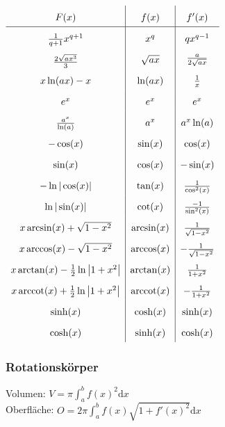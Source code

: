 \documentclass[6pt,a4paper]{scrartcl}
\DeclareMathOperator{\arccot}{arccot}
\begin{document}
\begin{multicols*}{4}
\everymath{\displaystyle}	%
\begin{math}\renewcommand{\arraystretch}{1.8}
\begin{array}{c|c|c}
F(x) & f(x) & f'(x) \\ \hline
\frac{1}{q+1}x^{q+1} & x^q & qx^{q-1} \\
\raisebox{-0.2em}{$\frac{2\sqrt{ax^3}}{3}$} & \sqrt{ax} & \raisebox{0.2em}{$\frac{a}{2\sqrt{ax}}$}\\
x\ln(ax) -x & \ln(ax) & \textstyle \frac{1}{x}\\
e^x & e^x & e^x \\
\frac{a^x}{\ln(a)} & a^x & a^x \ln(a) \\
-\cos(x) & \sin(x) & \cos(x)\\
\sin(x) & \cos(x) & -\sin(x)\\
-\ln |\cos(x)| & \tan(x) & \frac{1}{\cos^2(x)} \\
\ln |\sin(x)| & \cot(x) & \frac{-1}{\sin^2(x)} \\
x\arcsin (x)+\sqrt{1-x^2} & \arcsin(x) & \frac{1}{\sqrt{1-x^2}}\\
x\arccos (x)-\sqrt{1-x^2} & \arccos(x) & -\frac{1}{\sqrt{1-x^2}}\\
x\arctan (x)-\frac{1}{2} \ln \left| 1+ x^2 \right| & \arctan (x) & \frac{1}{1+x^2} \\
x\arccot (x)+\frac{1}{2} \ln \left| 1+ x^2 \right| & \arccot (x) & -\frac{1}{1+x^2} \\
\sinh(x) & \cosh(x) & \sinh (x) \\
\cosh(x) & \sinh(x) & \cosh (x)\\
\end{array}
\end{math}
\everymath{\textstyle}


\subsubsection{Rotationskörper}
Volumen: $V = \pi \int_a^b f(x)^2 \mathrm dx$\\
Oberfläche: $O = 2 \pi \int_a^b f(x) \sqrt{1 + f'(x)^2} \mathrm dx$


\end{multicols*}
\end{document}
